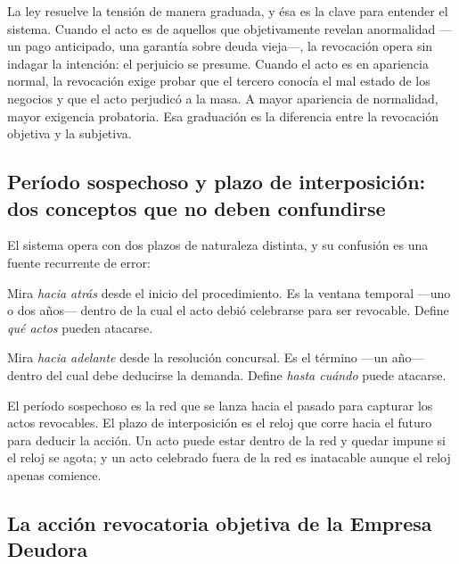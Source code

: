 La ley resuelve la tensión de manera graduada, y ésa es la clave para entender el sistema.
Cuando el acto es de aquellos que objetivamente revelan anormalidad ---un pago anticipado,
una garantía sobre deuda vieja---, la revocación opera sin indagar la intención: el perjuicio
se presume. Cuando el acto es en apariencia normal, la revocación exige probar que el tercero
conocía el mal estado de los negocios y que el acto perjudicó a la masa. A mayor apariencia
de normalidad, mayor exigencia probatoria. Esa graduación es la diferencia entre la
revocación objetiva y la subjetiva.

\bloqueNormativo

\subsection{Período sospechoso y plazo de interposición: dos conceptos que no deben confundirse}

El sistema opera con dos plazos de naturaleza distinta, y su confusión es una fuente
recurrente de error:

\begin{description}[leftmargin=0pt,style=nextline,font=\sffamily\bfseries]
  \item[El período sospechoso] Mira \emph{hacia atrás} desde el inicio del procedimiento. Es
  la ventana temporal ---uno o dos años--- dentro de la cual el acto debió celebrarse para ser
  revocable. Define \emph{qué actos} pueden atacarse.

  \item[El plazo de interposición] Mira \emph{hacia adelante} desde la resolución concursal.
  Es el término ---un año--- dentro del cual debe deducirse la demanda. Define \emph{hasta
  cuándo} puede atacarse.
\end{description}

\begin{foco}
El período sospechoso es la red que se lanza hacia el pasado para capturar los actos
revocables. El plazo de interposición es el reloj que corre hacia el futuro para deducir la
acción. Un acto puede estar dentro de la red y quedar impune si el reloj se agota; y un acto
celebrado fuera de la red es inatacable aunque el reloj apenas comience.
\end{foco}

\subsection{La acción revocatoria objetiva de la Empresa Deudora}


